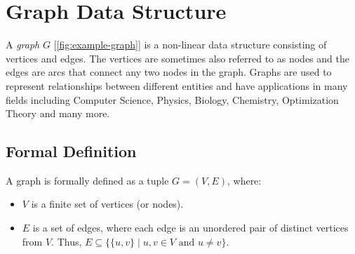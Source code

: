 \section{Graph Data Structure}
\label{sec:graph_data_structure}

A \emph{graph} $G$ [\autoref{fig:example-graph}] is a non-linear data structure consisting of vertices and edges. The vertices are sometimes also referred to as nodes and the edges are arcs that connect any two nodes in the graph. Graphs are used to represent relationships between different entities and have applications in many fields including Computer Science, Physics, Biology, Chemistry, Optimization Theory and many more.


\subsection{Formal Definition}
A graph is formally defined as a tuple $G = (V, E)$, where:
\begin{itemize}
    \item $V$ is a finite set of vertices (or nodes).
    \item $E$ is a set of edges, where each edge is an unordered pair of distinct vertices from $V$. Thus, $E \subseteq \{\{u, v\} \mid u, v \in V \text{ and } u \neq v\}$.
\end{itemize}


